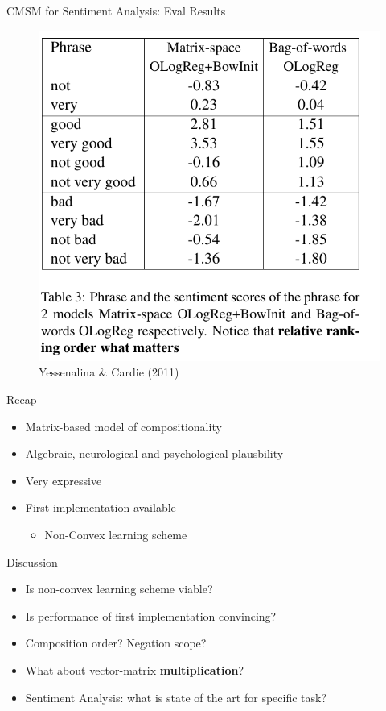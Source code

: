\documentclass[12pt,a4paper]{beamer}
\begin{document}
\begin{frame}{CMSM for Sentiment Analysis: Eval Results}
\begin{figure}
\includegraphics[scale=0.45]{cmsm_for_se_table3.png}
\caption{Yessenalina \&  Cardie (2011)}
\end{figure}

\end{frame}


\begin{frame}{Recap}
\begin{itemize}
\item Matrix-based model of compositionality
\item Algebraic, neurological and psychological plausbility
\item Very expressive
\item First implementation available
    \begin{itemize}
    \item Non-Convex learning scheme
    \end{itemize}
\end{itemize}
\end{frame}

\begin{frame}{Discussion}
\begin{itemize}
\item Is non-convex learning scheme viable?
\item Is performance of first implementation convincing?
\item Composition order? Negation scope? \cite{cmsmse} 
\item What about vector-matrix \textbf{multiplication}?
\item Sentiment Analysis: what is state of the art for specific task?
\end{itemize}
\end{frame}
\end{document}
